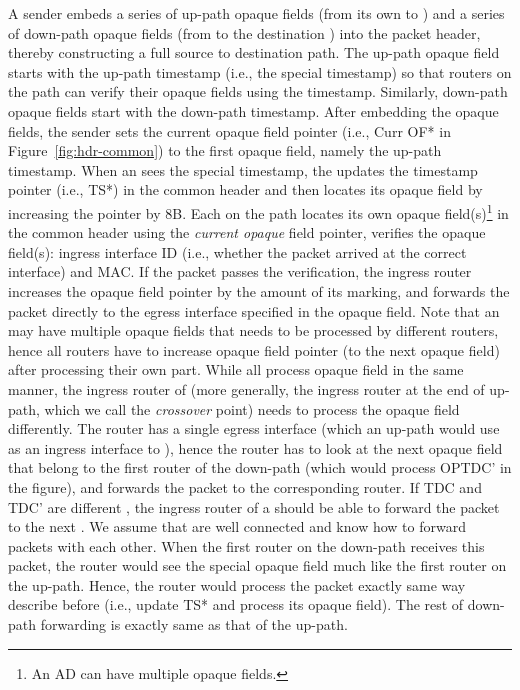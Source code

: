 \noindent A sender embeds a series of up-path opaque fields (from its own \AD to \ISDC \AD) and a series of down-path opaque fields (from \ISDC \AD to the destination \AD) into the packet header, thereby constructing a full source to destination path. The up-path opaque field starts with the up-path timestamp (i.e., the special timestamp) so that routers on the path can verify their opaque fields using the timestamp. Similarly, down-path opaque fields start with the down-path timestamp. After embedding the opaque fields, the sender sets the current opaque field pointer (i.e., Curr OF* in Figure~\ref{fig:hdr-common}) to the first opaque field, namely the up-path timestamp. When an \AD sees the special timestamp, the \AD updates the timestamp pointer (i.e., TS*) in the common header and then locates its opaque field by increasing the pointer by 8B. Each \AD on the path locates its own opaque field(s)\footnote{An AD can have multiple opaque fields.} in the common header using the {\em current opaque} field pointer, verifies the opaque field(s): ingress interface ID (i.e., whether the packet arrived at the correct interface) and MAC. If the packet passes the verification, the ingress router increases the opaque field pointer by the amount of its marking, and forwards the packet directly to the egress interface specified in the opaque field. Note that an \AD may have multiple opaque fields that needs to be processed by different routers, hence all routers have to increase opaque field pointer (to the next opaque field) after processing their own part. While all \ADs process opaque field in the same manner, the ingress router of \ISDC \AD (more generally, the ingress router at the end of up-path, which we call the {\em crossover} point) needs to process the opaque field differently. The router has a single egress interface (which an up-path would use as an ingress interface to \ISDC \AD), hence the router has to look at the next opaque field that belong to the first router of the down-path (which would process OPTDC' in the figure), and forwards the packet to the corresponding router. If TDC and TDC' are different \ISDC \ADs, the ingress router of a \ISDC \AD should be able to forward the packet to the next \ISDC \AD. We assume that \ISDC \ADs are well connected and know how to forward packets with each other. When the first router on the down-path receives this packet, the router would see the special opaque field much like the first router on the up-path. Hence, the router would process the packet exactly same way describe before (i.e., update TS* and process its opaque field). The rest of down-path forwarding is exactly same as that of the up-path. 



